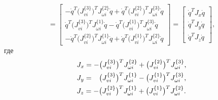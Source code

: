 \begin{equation}
    =
    \begin{bmatrix}
        -\dot{q}^T \bigl(J_{vi}^{\{3\}} \bigr)^T J_{\omega i}^{\{2\}} \dot{q} +
        \dot{q}^T \bigl( J_{vi}^{\{2\}} \bigr)^T J_{\omega i}^{\{3\}} \dot{q}
        \\
        \dot{q}^T \bigl( J_{vi}^{\{3\}} \bigr)^T J_{\omega i}^{\{1\}} \dot{q} -
        \dot{q}^T \bigl( J_{vi}^{\{1\}} \bigr)^T J_{\omega i}^{\{3\}} \dot{q}
        \\
        -\dot{q}^T \bigl( J_{vi}^{\{2\}} \bigr)^T J_{\omega i}^{\{1\}} \dot{q} +
        \dot{q}^T \bigl( J_{vi}^{\{1\}} \bigr)^T J_{\omega i}^{\{2\}} \dot{q}
    \end{bmatrix}
    =
    \begin{bmatrix}
        \dot{q}^T \! J_x \dot{q} \\
        \dot{q}^T \! J_y \dot{q} \\
        \dot{q}^T \! J_z \dot{q}
    \end{bmatrix}\!\!,
\end{equation}
где
\begin{align}
    &J_x =  - \bigl( J_{vi}^{\{3\}} \bigr)^T J_{\omega i}^{\{2\}} + \bigl( J_{vi}^{\{2\}} \bigr)^T J_{\omega i}^{\{3\}}, \\
    &J_y = \phantom{-}\bigl( J_{vi}^{\{3\}} \bigr)^T J_{\omega i}^{\{1\}} - \bigl( J_{vi}^{\{1\}} \bigr)^T J_{\omega i}^{\{3\}}, \\
    &J_z =  - \bigl( J_{vi}^{\{2\}} \bigr)^T J_{\omega i}^{\{1\}} + \bigl( J_{vi}^{\{1\}} \bigr)^T J_{\omega i}^{\{2\}} \ldotp
\end{align}
\newpage
